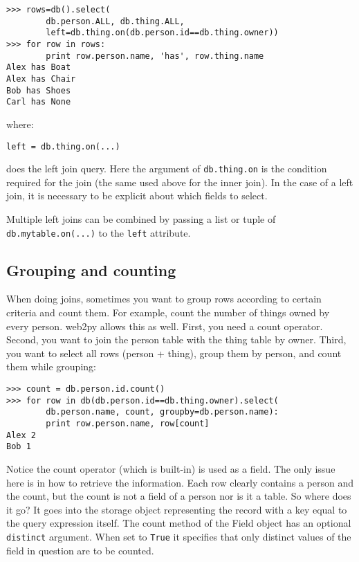 \documentclass[justified,sixbynine,notoc]{tufte-book}
\def\ft{\small\tt}
\def\inxx#1{\index{#1}}
\begin{document}
\begin{fullwidth}
\inxx{Rows} \inxx{left outer join} \inxx{outer join}
\begin{lstlisting}
>>> rows=db().select(
        db.person.ALL, db.thing.ALL,
        left=db.thing.on(db.person.id==db.thing.owner))
>>> for row in rows:
        print row.person.name, 'has', row.thing.name
Alex has Boat
Alex has Chair
Bob has Shoes
Carl has None
\end{lstlisting}
\noindent where:
\begin{lstlisting}
left = db.thing.on(...)
\end{lstlisting}
\noindent does the left join query. Here the argument of {\ft db.thing.on} is the condition required for the join (the same used above for the inner join). In the case of a left join, it is necessary to be explicit about which fields to select.

Multiple left joins can be combined by passing a list or tuple of {\ft db.mytable.on(...)} to the  {\ft left} attribute.

\goodbreak\subsection{Grouping and counting}

When doing joins, sometimes you want to group rows according to certain criteria and count them. For example, count the number of things owned by every person. web2py allows this as well. First, you need a count operator. Second, you want to join the person table with the thing table by owner. Third, you want to select all rows (person + thing), group them by person, and count them while grouping:

\inxx{grouping}
\begin{lstlisting}
>>> count = db.person.id.count()
>>> for row in db(db.person.id==db.thing.owner).select(
        db.person.name, count, groupby=db.person.name):
        print row.person.name, row[count]
Alex 2
Bob 1
\end{lstlisting}

Notice the count operator (which is built-in) is used as a field. The only issue here is in how to retrieve the information. Each row clearly contains a person and the count, but the count is not a field of a person nor is it a table. So where does it go? It goes into the storage object representing the record with a key equal to the query expression itself. The count method of the Field object has an optional {\ft distinct} argument. When set to {\ft True} it specifies that only distinct values of the field in question are to be counted.


\end{fullwidth}
\end{document}
